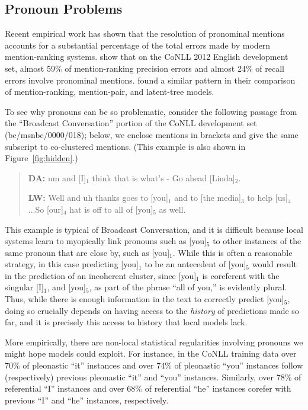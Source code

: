 \documentclass[11pt,letterpaper]{article}
\begin{document}
\subsection{Pronoun Problems}
Recent empirical work has shown that the resolution of pronominal mentions accounts for a substantial percentage of the total errors made by modern mention-ranking systems.  show that on the CoNLL 2012 English development set, almost 59\% of mention-ranking precision errors and almost 24\% of recall errors involve pronominal mentions.  found a similar pattern in their comparison of mention-ranking, mention-pair, and latent-tree models.  

To see why pronouns can be so problematic, consider the following passage from the ``Broadcast Conversation'' portion of the CoNLL development set (bc/msnbc/0000/018); below, we enclose mentions in brackets and give the same subscript to co-clustered mentions. (This example is also shown in Figure~\ref{fig:hidden}.)

\vspace{-1mm}
{\small
\begin{quote}
\small
\textbf{DA:} um and [I]$_1$ think that is what's - Go ahead [Linda]$_2$.

\textbf{LW:} Well and uh thanks goes to [you]$_1$ and to [the media]$_3$ to help [us]$_4$...So [our]$_4$ hat is off to all of [you]$_5$ as well.
\end{quote} 
}

\vspace{-1mm}
\noindent This example is typical of Broadcast Conversation, and it is difficult because local systems learn to myopically link pronouns such as [you]$_5$ to other instances of the same pronoun that are close by, such as [you]$_1$. While this is often a reasonable strategy, in this case predicting [you]$_1$ to be an antecedent of [you]$_5$ would result in the prediction of an incoherent cluster, since [you]$_1$ is coreferent with the singular [I]$_1$, and [you]$_5$, as part of the phrase ``all of you,'' is evidently plural. Thus, while there is enough information in the text to correctly predict [you]$_5$, doing so crucially depends on having access to the \textit{history} of predictions made so far, and it is precisely this access to history that local models lack. 

More empirically, there are non-local statistical regularities involving pronouns we might hope models could exploit. For instance, in the CoNLL training data over 70\% of pleonastic ``it'' instances and over 74\% of pleonastic ``you'' instances follow (respectively) previous pleonastic ``it'' and ``you'' instances. Similarly, over 78\% of referential ``I'' instances and over 68\% of referential ``he'' instances corefer with previous ``I'' and ``he'' instances, respectively.
\end{document}

